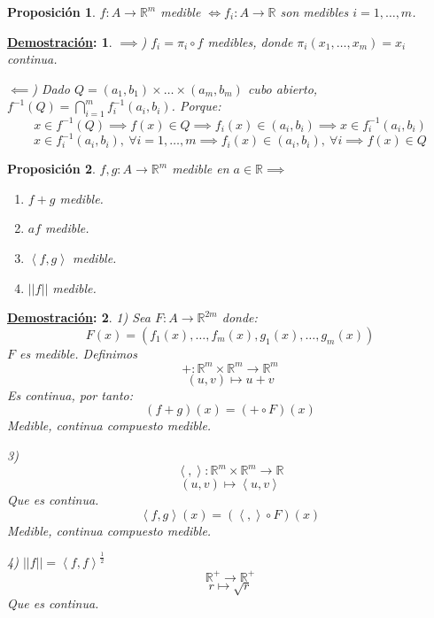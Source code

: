 \documentclass[10pt,a4paper,openright]{book}
\theoremstyle{break}
\newtheorem*{prop}{Proposición}
\newtheorem*{demo}{\underline{Demostración}:}
\begin{document}
\begin{prop}
$f: A \to \mathbb{R}^m$ medible $\iff f_i: A \to \mathbb{R}$ son medibles $i = 1,\ldots, m$.
\end{prop}
\begin{demo}
$\implies$) $f_i = \pi_i \circ f$ medibles, donde $\pi_i\left( x_1, \ldots, x_m \right) = x_i$ continua.

$\impliedby$) Dado $Q = \left( a_1, b_1 \right) \times \ldots \times \left( a_m, b_m \right)$ cubo abierto, $f^{-1}\left( Q \right) = \bigcap_{i = 1}^{m} f_i^{-1}\left( a_i, b_i \right)$. Porque:
$$x \in f^{-1}\left( Q \right) \implies f\left( x \right) \in Q \implies f_i\left( x \right) \in \left( a_i, b_i \right) \implies x \in f_i^{-1}\left( a_i, b_i \right)$$
$$x \in f_i^{-1}\left( a_i, b_i \right),\ \forall i = 1,\ldots, m\implies f_i\left( x \right) \in \left( a_i, b_i \right),\ \forall i \implies f\left( x \right) \in Q$$
\end{demo}

\begin{prop}
$f, g: A \to \mathbb{R}^m$ medible en $a \in \mathbb{R} \implies$
\begin{enumerate}
\item $f+g$ medible.
\item $af$ medible.
\item $\left<f, g\right>$ medible.
\item $\vert \vert f \vert \vert$ medible.
\end{enumerate}
\end{prop}
\begin{demo}
1) Sea $F: A \to \mathbb{R}^{2m}$ donde:
$$F\left( x \right) = \left( f_1\left( x \right), \ldots, f_m\left( x \right), g_1\left( x \right), \ldots, g_m\left( x \right) \right)$$
$F$ es medible. Definimos 
$$+: \mathbb{R}^m \times \mathbb{R}^m \to \mathbb{R}^m$$
$$\left( u, v \right) \mapsto u + v$$
Es continua, por tanto:
$$\left( f + g \right)\left( x \right) = \left( + \circ F \right)\left( x \right)$$
Medible, continua compuesto medible.

3) $$\left<,\right>: \mathbb{R}^m \times \mathbb{R}^m \to \mathbb{R}$$
$$\left( u, v \right) \mapsto \left<u, v\right>$$
Que es continua.
$$\left<f, g\right> \left( x \right) = \left( \left<, \right> \circ F \right)\left( x \right)$$
Medible, continua compuesto medible.

4) $\vert \vert f \vert \vert = \left<f, f\right>^{\frac{1}{2}}$
$$\mathbb{R}^+ \to \mathbb{R}^+$$
$$r \mapsto \sqrt{r}$$
Que es continua.
\end{demo}
\end{document}

